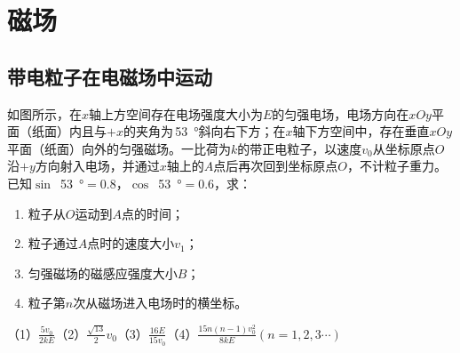 \section{磁场}

\subsection{带电粒子在电磁场中运动}

\begin{proset}
    如图所示，在\(x\)轴上方空间存在电场强度大小为\(E\)的匀强电场，电场方向在\(xOy\)平面（纸面）内且与\( + x\)的夹角为\,\qty{53}{\degree}斜向右下方；在\(x\)轴下方空间中，存在垂直\(xOy\)平面（纸面）向外的匀强磁场。一比荷为\(k\)的带正电粒子，以速度\(v_0\)从坐标原点\(O\)沿\( + y\)方向射入电场，并通过\(x\)轴上的\(A\)点后再次回到坐标原点\(O\)，不计粒子重力。已知\(\sin\) \,\qty{53}{\degree}\( = 0.8\)，\(\cos\) \,\qty{53}{\degree}\( = 0.6\)，求：
    \begin{enumerate}[(1)]
        \item 粒子从\(O\)运动到\(A\)点的时间；
        \item 粒子通过\(A\)点时的速度大小\(v_1\)；
        \item 匀强磁场的磁感应强度大小\(B\)；
        \item 粒子第\(n\)次从磁场进入电场时的横坐标。
    \end{enumerate}
\end{proset}
\begin{answer}
    （1）\(\frac{5v_0}{2kE}\)（2）\(\frac{\sqrt{13}}{2}v_0 \)（3）\(\frac{16E}{15v_0}\)（4）\(\frac{15n(n - 1)v_0^2}{8kE}(n =1,2,3\cdots)\)
\end{answer}